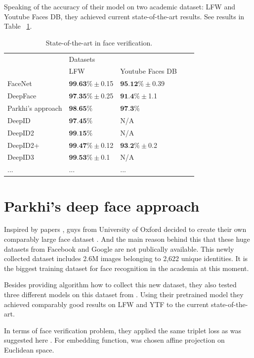 \documentclass[paper=a4, fontsize=11pt]{scrartcl} %
\numberwithin{equation}{section} %
\numberwithin{figure}{section} %
\numberwithin{table}{section} %
\begin{document}
Speaking of the accuracy of their model on two academic dataset: LFW and Youtube Faces DB, they achieved current state-of-the-art results. See results in Table ~\ref{tab:table2}.

\begin{table}[!htb]
\centering
\begin{tabular}{|l|l|l|l|l|}
\hline
\multirow{2}{*}{} Models & \multicolumn{2}{l|}{Datasets} \\ \cline{2-3} 
                  &   LFW  &  Youtube Faces DB        \\ \hline
               FaceNet   &  $\textbf{99.63}\% \pm$0.15   &   $\textbf{95.12}\% \pm$0.39       \\ \hline
               DeepFace &  $\textbf{97.35}\% \pm$0.25   &  $\textbf{91.4}\% \pm$1.1       \\ \hline
               Parkhi's approach		& $\textbf{98.65}\%$	 & $\textbf{97.3}\%$ \\ \hline
               DeepID &  $\textbf{97.45}\%$	   &  N/A       \\ \hline
               DeepID2 &  $\textbf{99.15}\%$   &  N/A       \\ \hline
               DeepID2+ &  $\textbf{99.47}\% \pm$0.12   &  $\textbf{93.2}\% \pm$0.2       \\ \hline
               DeepID3 &  $\textbf{99.53}\% \pm$0.1   &  N/A       \\ \hline
               ... & ... & ... \\ \hline
\end{tabular}
\caption{State-of-the-art in face verification.}
\label{tab:table2}
\end{table}

\section{Parkhi's deep face approach}

Inspired by papers \cite{taigman2014deepface, schroff2015facenet}, guys from University of Oxford decided to create their own comparably large face dataset \cite{parkhi2015deep}. And the main reason behind this that these huge datasets from Facebook and Google are not publically available. This newly collected dataset includes 2.6M images belonging to 2,622 unique identities. It is the biggest training dataset for face recognition in the academia at this moment. \par
Besides providing algorithm how to collect this new dataset, they also tested three different models on this dataset from \cite{simonyan2014very}. Using their pretrained model they achieved comparably good results on LFW and YTF to the current state-of-the-art.\par
In terms of face verification problem, they applied the same triplet loss as was suggested here \cite{schroff2015facenet}. For embedding function, was chosen affine projection on Euclidean space.
\end{document}
